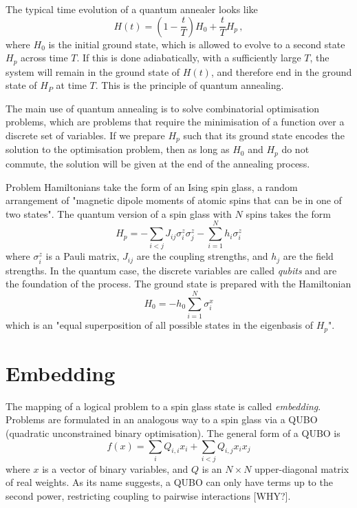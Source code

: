 \documentclass[aps,pra,10pt,twocolumn]{revtex4-2}
\begin{document}
The typical time evolution of a quantum annealer looks like
\begin{equation}
    H(t)=\left(1- \frac{t}{T}\right)H_0 + \frac{t}{T}H_p \,,
    \label{eq:time-evolution}
\end{equation}
where $H_0$ is the initial ground state, which is allowed to evolve to a second state $H_p$ across time $T$. If this is done adiabatically, with a sufficiently large $T$, the system will remain in the ground state of $H(t)$, and therefore end in the ground state of $H_P$ at time $T$. This is the principle of quantum annealing.

The main use of quantum annealing is to solve combinatorial optimisation problems, which are problems that require the minimisation of a function over a discrete set of variables. If we prepare $H_p$ such that its ground state encodes the solution to the optimisation problem, then as long as $H_0$ and $H_p$ do not commute, the solution will be given at the end of the annealing process.

Problem Hamiltonians take the form of an Ising spin glass, a random arrangement of "magnetic dipole moments of atomic spins that can be in one of two states". The quantum version of a spin glass with $N$ spins takes the form
\begin{equation}
    H_p = -\sum_{i<j}J_{ij}\sigma_i^z\sigma_j^z - \sum_{i=1}^{N}h_i\sigma_i^z
    \label{eq:ising}
\end{equation}
where $\sigma_i^z$ is a Pauli matrix, $J_{ij}$ are the coupling strengths, and $h_j$ are the field strengths. In the quantum case, the discrete variables are called \textit{qubits} and are the foundation of the process. The ground state is prepared with the Hamiltonian
\begin{equation}
    H_0 = -h_0\sum_{i=1}^{N}\sigma_i^x
\end{equation}
which is an "equal superposition of all possible states in the eigenbasis of $H_p$".

\section{Embedding}

The mapping of a logical problem to a spin glass state is called \textit{embedding}. Problems are formulated in an analogous way to a spin glass via a QUBO (quadratic unconstrained binary optimisation). The general form of a QUBO is
\begin{equation}
    f(x)=\sum_iQ_{i,i}x_i+\sum_{i<j}Q_{i,j}x_ix_j
    \label{eq:QUBO}
\end{equation}
where $x$ is a vector of binary variables, and $Q$ is an $N\times N$ upper-diagonal matrix of real weights. As its name suggests, a QUBO can only have terms up to the second power, restricting coupling to pairwise interactions [WHY?].
\end{document}

